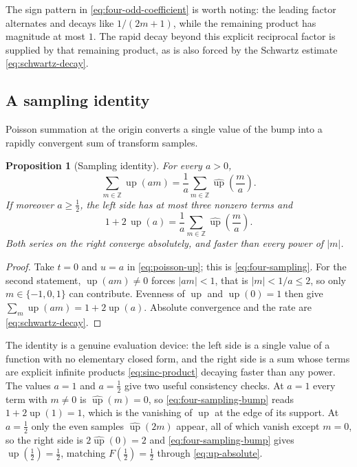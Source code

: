 \documentclass[11pt,oneside]{article}
\newtheorem{proposition}[theorem]{Proposition}
\theoremstyle{definition}
\theoremstyle{remark}
\newcommand{\Z}{\mathbb Z}
\newcommand{\Up}{\operatorname{up}}
\begin{document}
The sign pattern in \eqref{eq:four-odd-coefficient} is worth noting: the leading factor
alternates and decays like $1/(2m+1)$, while the remaining product has magnitude at most
$1$.  The rapid decay beyond this explicit reciprocal factor is supplied by that remaining
product, as is also forced by the Schwartz estimate \eqref{eq:schwartz-decay}.


\subsection{A sampling identity}

Poisson summation at the origin converts a single value of the bump into a rapidly
convergent sum of transform samples.

\begin{proposition}[Sampling identity]
\label{prop:four-sampling}
For every $a>0$,
\begin{equation}
 \sum_{m\in\Z}\Up(am)=\frac1a\sum_{m\in\Z}\widehat{\Up}\!\left(\frac ma\right).
                                                          \label{eq:four-sampling}
\end{equation}
If moreover $a\ge\tfrac12$, the left side has at most three nonzero terms and
\begin{equation}
 1+2\,\Up(a)=\frac1a\sum_{m\in\Z}\widehat{\Up}\!\left(\frac ma\right).
                                                          \label{eq:four-sampling-bump}
\end{equation}
Both series on the right converge absolutely, and faster than every power of $|m|$.
\end{proposition}

\begin{proof}
Take $t=0$ and $u=a$ in \eqref{eq:poisson-up}; this is \eqref{eq:four-sampling}.  For the
second statement, $\Up(am)\ne0$ forces $|am|<1$, that is $|m|<1/a\le2$, so only
$m\in\{-1,0,1\}$ can contribute.  Evenness of $\Up$ and $\Up(0)=1$ then give
$\sum_m\Up(am)=1+2\Up(a)$.  Absolute convergence and the rate are
\eqref{eq:schwartz-decay}.
\end{proof}

The identity is a genuine evaluation device: the left side is a single value of a function
with no elementary closed form, and the right side is a sum whose terms are explicit infinite
products \eqref{eq:sinc-product} decaying faster than any power.  The values $a=1$ and
$a=\tfrac12$ give two useful consistency checks.  At $a=1$ every term with $m\ne0$ is
$\widehat{\Up}(m)=0$, so \eqref{eq:four-sampling-bump} reads $1+2\Up(1)=1$, which is the
vanishing of $\Up$ at the edge of its support.  At $a=\tfrac12$ only the even samples
$\widehat{\Up}(2m)$ appear, all of which vanish except $m=0$, so the right side is
$2\widehat{\Up}(0)=2$ and \eqref{eq:four-sampling-bump} gives $\Up(\tfrac12)=\tfrac12$,
matching $F(\tfrac12)=\tfrac12$ through \eqref{eq:up-absolute}.
\end{document}
